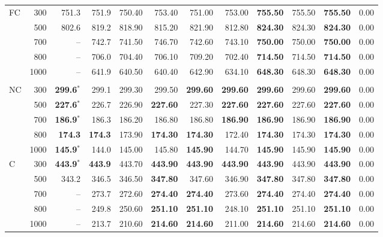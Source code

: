 \begin{table}[htbp]
{\begin{tabular}{lrrrrrrrrrrr}
\addlinespace[2pt]
FC & 300 & 751.3 & 751.9 & 750.40 & 753.40 & 751.00 & 753.00 & \textbf{755.50} & 755.50 & \textbf{755.50} & 0.00 \\
 & 500 & 802.6 & 819.2 & 818.90 & 815.20 & 821.90 & 812.80 & \textbf{824.30} & 824.30 & \textbf{824.30} & 0.00 \\
 & 700 & -- & 742.7 & 741.50 & 746.70 & 742.60 & 743.10 & \textbf{750.00} & 750.00 & \textbf{750.00} & 0.00 \\
 & 800 & -- & 706.0 & 704.40 & 706.10 & 709.20 & 702.40 & \textbf{714.50} & 714.50 & \textbf{714.50} & 0.00 \\
 & 1000 & -- & 641.9 & 640.50 & 640.40 & 642.90 & 634.10 & \textbf{648.30} & 648.30 & \textbf{648.30} & 0.00 \\
\addlinespace
\multicolumn{12}{l}{\emph{Scenario 2}} \\
NC & 300 & \textbf{299.6}$^*$ & 299.1 & 299.30 & 299.50 & \textbf{299.60} & \textbf{299.60} & \textbf{299.60} & 299.60 & \textbf{299.60} & 0.00 \\
 & 500 & \textbf{227.6}$^*$ & 226.7 & 226.90 & \textbf{227.60} & 227.30 & \textbf{227.60} & \textbf{227.60} & 227.60 & \textbf{227.60} & 0.00 \\
 & 700 & \textbf{186.9}$^*$ & 186.3 & 186.20 & 186.80 & 186.80 & \textbf{186.90} & \textbf{186.90} & 186.90 & \textbf{186.90} & 0.00 \\
 & 800 & \textbf{174.3} & \textbf{174.3} & 173.90 & \textbf{174.30} & \textbf{174.30} & 172.40 & \textbf{174.30} & 174.30 & \textbf{174.30} & 0.00 \\
 & 1000 & \textbf{145.9}$^*$ & 144.0 & 145.00 & 145.80 & \textbf{145.90} & 144.70 & \textbf{145.90} & 145.90 & \textbf{145.90} & 0.00 \\
\addlinespace[2pt]
C & 300 & \textbf{443.9}$^*$ & \textbf{443.9} & 443.70 & \textbf{443.90} & \textbf{443.90} & \textbf{443.90} & \textbf{443.90} & 443.90 & \textbf{443.90} & 0.00 \\
 & 500 & 343.2 & 346.5 & 346.50 & \textbf{347.80} & 347.60 & 346.90 & \textbf{347.80} & 347.80 & \textbf{347.80} & 0.00 \\
 & 700 & -- & 273.7 & 272.60 & \textbf{274.40} & \textbf{274.40} & 273.60 & \textbf{274.40} & 274.40 & \textbf{274.40} & 0.00 \\
 & 800 & -- & 249.8 & 250.60 & \textbf{251.10} & \textbf{251.10} & 248.10 & \textbf{251.10} & 251.10 & \textbf{251.10} & 0.00 \\
 & 1000 & -- & 213.7 & 210.60 & \textbf{214.60} & \textbf{214.60} & 211.00 & \textbf{214.60} & 214.60 & \textbf{214.60} & 0.00 \\

\end{tabular}}
\end{table}
